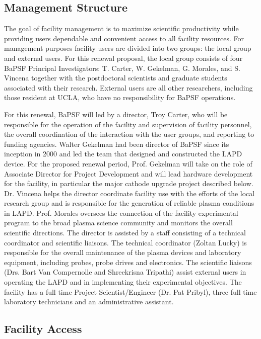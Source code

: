 \documentclass[11pt]{article}
\begin{document}
\subsection{Management Structure}

The goal of facility management is to maximize scientific productivity
while providing users dependable and convenient access to all facility
resources. For management purposes facility users are divided into two
groups: the local group and external users. For this renewal proposal,
the local group consists of four BaPSF Principal Investigators: T.
Carter, W. Gekelman, G. Morales, and S. Vincena together with the
postdoctoral scientists and graduate students associated with their
research. External users are all other researchers, including those
resident at UCLA, who have no responsibility for BaPSF
operations.

For this renewal, BaPSF will led by a director, Troy Carter, who will be
responsible for the operation of the facility and supervision of
facility personnel, the overall coordination of the interaction with the
user groups, and reporting to funding agencies. Walter Gekelman had been
director of BaPSF since its inception in 2000 and led the team that
designed and constructed the LAPD device. For the proposed renewal
period, Prof. Gekelman will take on the role of Associate Director for
Project Development and will lead hardware development for the facility,
in particular the major cathode upgrade project described below. Dr.
Vincena helps the director coordinate facility use with the efforts of
the local research group and is responsible for the generation of
reliable plasma conditions in LAPD. Prof. Morales oversees the
connection of the facility experimental program to the broad plasma
science community and monitors the overall scientific directions. The
director is assisted by a staff consisting of a technical coordinator
and scientific liaisons. The technical coordinator (Zoltan Lucky) is
responsible for the overall maintenance of the plasma devices and
laboratory equipment, including probes, probe drives and electronics.
The scientific liaisons (Drs. Bart Van Compernolle and Shreekrisna
Tripathi) assist external users in operating the LAPD and in
implementing their experimental objectives. The facility has a full time
Project Scientist/Engineer (Dr. Pat Pribyl), three full time laboratory
technicians and an administrative assistant.

\subsection{Facility Access}
\end{document}
